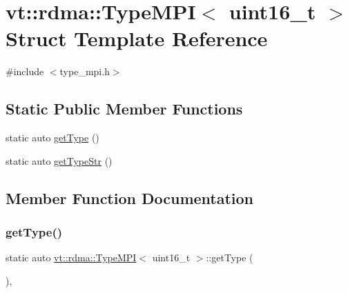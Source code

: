 \hypertarget{structvt_1_1rdma_1_1_type_m_p_i_3_01uint16__t_01_4}{}\section{vt\+:\+:rdma\+:\+:Type\+M\+PI$<$ uint16\+\_\+t $>$ Struct Template Reference}
\label{structvt_1_1rdma_1_1_type_m_p_i_3_01uint16__t_01_4}


{\ttfamily \#include $<$type\+\_\+mpi.\+h$>$}

\subsection*{Static Public Member Functions}
\begin{DoxyCompactItemize}
\item 
static auto \hyperlink{structvt_1_1rdma_1_1_type_m_p_i_3_01uint16__t_01_4_a1e0744d7fa90087eb270ac7b16baf424}{get\+Type} ()
\item 
static auto \hyperlink{structvt_1_1rdma_1_1_type_m_p_i_3_01uint16__t_01_4_a52d04b9bfcf4d5b442f3414c0fd9987c}{get\+Type\+Str} ()
\end{DoxyCompactItemize}


\subsection{Member Function Documentation}
\mbox{\label{structvt_1_1rdma_1_1_type_m_p_i_3_01uint16__t_01_4_a1e0744d7fa90087eb270ac7b16baf424}} 
\subsubsection{\texorpdfstring{get\+Type()}{getType()}}
{\footnotesize\ttfamily static auto \hyperlink{structvt_1_1rdma_1_1_type_m_p_i}{vt\+::rdma\+::\+Type\+M\+PI}$<$ uint16\+\_\+t $>$\+::get\+Type (\begin{DoxyParamCaption}{ }\end{DoxyParamCaption})\hspace{0.3cm}{\ttfamily [inline]}, {\ttfamily [static]}}

